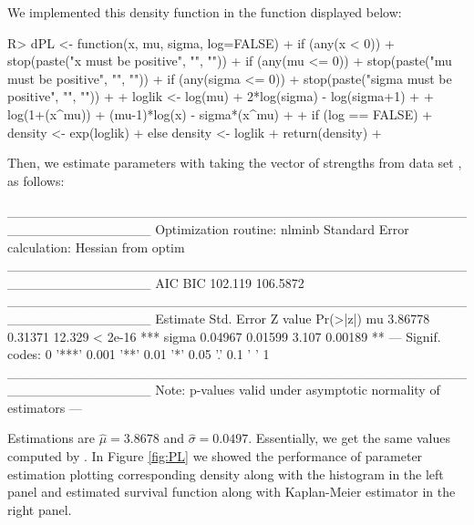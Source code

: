 \documentclass[nojss]{jss}
\begin{document}
We implemented this density function in the  function  displayed below:

\begin{Schunk}
\begin{Sinput}
R> dPL <- function(x, mu, sigma, log=FALSE){
+    if (any(x < 0))
+      stop(paste("x must be positive", "\n", ""))
+    if (any(mu <= 0))
+      stop(paste("mu must be positive", "\n", ""))
+    if (any(sigma <= 0))
+      stop(paste("sigma must be positive", "\n", ""))
+  
+    loglik <- log(mu) + 2*log(sigma) - log(sigma+1) +
+      log(1+(x^mu)) + (mu-1)*log(x) - sigma*(x^mu)
+  
+    if (log == FALSE)
+      density <- exp(loglik)
+    else density <- loglik
+    return(density)
+  }
\end{Sinput}
\end{Schunk}

Then, we estimate parameters with  taking the vector of strengths from data set , as follows:

\begin{Schunk}
\begin{Soutput}
_______________________________________________________________
Optimization routine: nlminb 
Standard Error calculation: Hessian from optim 
_______________________________________________________________
      AIC      BIC
  102.119 106.5872
_______________________________________________________________
      Estimate  Std. Error Z value Pr(>|z|)    
mu      3.86778    0.31371  12.329  < 2e-16 ***
sigma   0.04967    0.01599   3.107  0.00189 ** 
---
Signif. codes:  0 '***' 0.001 '**' 0.01 '*' 0.05 '.' 0.1 ' ' 1
_______________________________________________________________
Note: p-values valid under asymptotic normality of estimators 
---
\end{Soutput}
\end{Schunk}

Estimations are $\hat{\mu}=3.8678$ and $\hat{\sigma}=0.0497$. Essentially, we get the same values computed by \cite{Ghitany2013}. In Figure \ref{fig:PL} we showed the performance of parameter estimation plotting corresponding density along with the histogram in the left panel and estimated survival function along with Kaplan-Meier estimator in the right panel.
\end{document}
